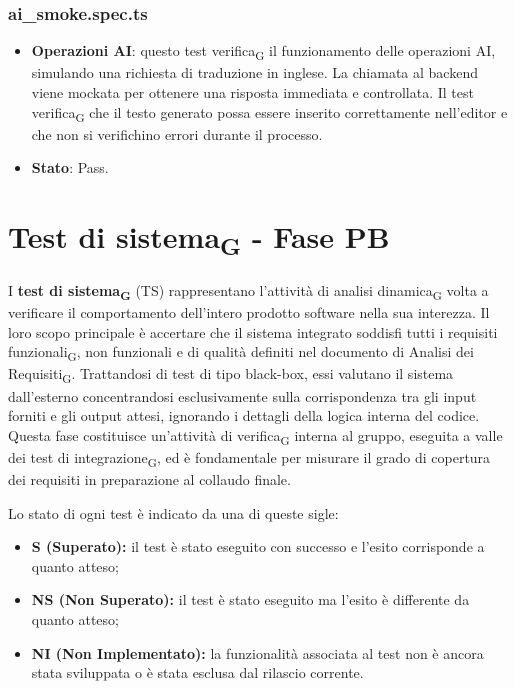 \documentclass[11pt,a4paper]{article}
\newcommand{\gls}[1]{#1\textsubscript{G}}
\begin{document}
\subsubsection{ai\_smoke.spec.ts}
\begin{itemize}
\item \textbf{Operazioni AI}: questo test \gls{verifica} il funzionamento delle operazioni AI, simulando una richiesta di traduzione in inglese. La chiamata al backend viene mockata per ottenere una risposta immediata e controllata. Il test \gls{verifica} che il testo generato possa essere inserito correttamente nell’editor e che non si verifichino errori durante il processo.
\item \textbf{Stato}: Pass.
\end{itemize}

\newpage

\section{\gls{Test di sistema} - Fase PB}
I \textbf{\gls{test di sistema}} (TS) rappresentano l'attività di \gls{analisi dinamica} volta a verificare il comportamento dell'intero prodotto software nella sua interezza. Il loro scopo principale è accertare che il sistema integrato soddisfi tutti i \gls{requisiti funzionali}, non funzionali e di qualità definiti nel documento di \gls{Analisi dei Requisiti}. Trattandosi di test di tipo black-box, essi valutano il sistema dall'esterno concentrandosi esclusivamente sulla corrispondenza tra gli input forniti e gli output attesi, ignorando i dettagli della logica interna del codice. Questa fase costituisce un'attività di \gls{verifica} interna al gruppo, eseguita a valle dei \gls{test di integrazione}, ed è fondamentale per misurare il grado di copertura dei requisiti in preparazione al collaudo finale.

Lo stato di ogni test è indicato da una di queste sigle:
\begin{itemize}
    \item \textbf{S (Superato):} il test è stato eseguito con successo e l'esito corrisponde a quanto atteso;
    \item \textbf{NS (Non Superato):} il test è stato eseguito ma l'esito è differente da quanto atteso;
    \item \textbf{NI (Non Implementato):} la funzionalità associata al test non è ancora stata sviluppata o è stata esclusa dal rilascio corrente.
\end{itemize}
\end{document}
